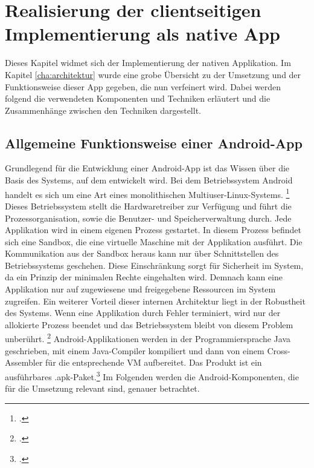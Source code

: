 \chapter{Realisierung der clientseitigen Implementierung als native App}
\label{cha:native-app}
Dieses Kapitel widmet sich der Implementierung der nativen Applikation. Im Kapitel \ref{cha:architektur} wurde eine grobe Übersicht zu der Umsetzung und der Funktionsweise dieser \ac{App} gegeben, die nun verfeinert wird.
Dabei werden folgend die verwendeten Komponenten und Techniken erläutert und die Zusammenhänge zwischen den Techniken dargestellt.
\section{Allgemeine Funktionsweise einer Android-App}
\label{sec:definition-android}
Grundlegend für die Entwicklung einer Android-App ist das Wissen über die Basis des Systems, auf dem entwickelt wird. 
Bei dem Betriebssystem \ac{Android} handelt es sich um eine Art eines \ac{monolithisch}en Multiuser-\ac{Linux}-Systems. \footcite{Android-Fundamentals}
Dieses Betriebssystem stellt die Hardwaretreiber zur Verfügung und führt die Prozessorganisation, sowie die Benutzer- und Speicherverwaltung durch.
Jede Applikation wird in einem eigenen Prozess gestartet. In diesem Prozess befindet sich eine \ac{Sandbox}, die eine virtuelle Maschine mit der Applikation ausführt. Die Kommunikation aus der Sandbox heraus kann nur über Schnittstellen des Betriebssystems geschehen. Diese Einschränkung sorgt für Sicherheit im System, da ein Prinzip der minimalen Rechte eingehalten wird. Demnach kann eine Applikation nur auf zugewiesene und freigegebene Ressourcen im System zugreifen. Ein weiterer Vorteil dieser internen Architektur liegt in der Robustheit des Systems. Wenn eine Applikation durch Fehler terminiert, wird nur der allokierte Prozess beendet und das Betriebssystem bleibt von diesem Problem unberührt. \footcite{Android-SystemPermissions}
Android-Applikationen werden in der Programmiersprache \ac{Java} geschrieben, mit einem Java-\ac{Compiler} kompiliert und dann von einem Cross-Assembler für die entsprechende \ac{VM} aufbereitet. Das Produkt ist ein ausführbares \ac{.apk}-Paket.\footcite[Seite 17-19]{Android-BeckerPant}
Im Folgenden werden die Android-Komponenten, die für die Umsetzung relevant sind, genauer betrachtet.
